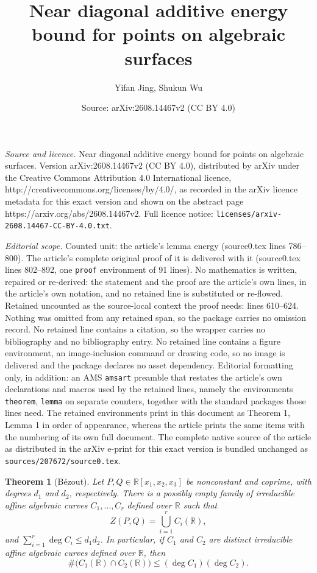 \documentclass[10pt,a4paper]{amsart}
\title{Near diagonal additive energy bound for points on algebraic surfaces}
\author{Yifan Jing, Shukun Wu}
\date{Source: arXiv:2608.14467v2 (CC BY 4.0)}
\newtheorem{theorem}{Theorem}
\newcommand{\R}{\mathbb{R}}
\begin{document}
\maketitle

\noindent\emph{Source and licence.} Near diagonal additive energy bound for points on algebraic surfaces. Version arXiv:2608.14467v2 (CC BY 4.0), distributed by arXiv under the Creative Commons Attribution 4.0 International licence, http://creativecommons.org/licenses/by/4.0/, as recorded in the arXiv licence metadata for this exact version and shown on the abstract page https://arxiv.org/abs/2608.14467v2. Full licence notice: \texttt{licenses/arxiv-2608.14467-CC-BY-4.0.txt}.\par\smallskip

\noindent\textit{Editorial scope.} Counted unit: the article's lemma energy (source0.tex lines 786--800). The article's complete original proof of it is delivered with it (source0.tex lines 802--892, one \texttt{proof} environment of 91 lines). No mathematics is written, repaired or re-derived: the statement and the proof are the article's own lines, in the article's own notation, and no retained line is substituted or re-flowed.  Retained uncounted as the source-local context the proof needs: lines 610--624.  Nothing was omitted from any retained span, so the package carries no omission record.  No retained line contains a citation, so the wrapper carries no bibliography and no bibliography entry.  No retained line contains a figure environment, an image-inclusion command or drawing code, so no image is delivered and the package declares no asset dependency.  Editorial formatting only, in addition: an AMS \texttt{amsart} preamble that restates the article's own declarations and macros used by the retained lines, namely the environments \texttt{theorem}, \texttt{lemma} on separate counters, together with the standard packages those lines need.  The retained environments print in this document as Theorem 1, Lemma 1 in order of appearance, whereas the article prints the same items with the numbering of its own full document.  The complete native source of the article as distributed in the arXiv e-print for this exact version is bundled unchanged as \texttt{sources/207672/source0.tex}.
\begin{theorem}[B\'ezout]\label{thm: Bezout}
Let $P,Q\in\R[x_1,x_2,x_3]$ be nonconstant and coprime, with degrees $d_1$ and $d_2$, respectively.
There is a possibly empty family of irreducible affine algebraic curves $C_1,\dots,C_r$ defined over $\R$ such that
\begin{equation}
\label{eq:bezout-decomposition}
    Z(P,Q)=\bigcup_{i=1}^r C_i(\R),
\end{equation}
and $\sum_{i=1}^r\deg C_i\leq d_1d_2$.
In particular, if $C_1$ and $C_2$ are distinct irreducible affine algebraic curves defined
over $\R$, then
\begin{equation}
\label{eq:curve-bezout}
    \#\bigl(C_1(\R)\cap C_2(\R)\bigr)  \leq(\deg C_1)(\deg C_2).
\end{equation}
\end{theorem}
\end{document}
